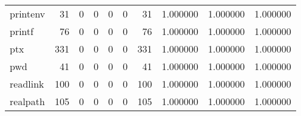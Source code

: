 \begin{tabular}{lrrrrrrrrr}
printenv  &                                        31 &                                                  0 &                                                  0 &                                                  0 &                                                  0 &                                                 31 &                                           1.000000 &                               1.000000 &                             1.000000 \\
printf    &                                        76 &                                                  0 &                                                  0 &                                                  0 &                                                  0 &                                                 76 &                                           1.000000 &                               1.000000 &                             1.000000 \\
ptx       &                                       331 &                                                  0 &                                                  0 &                                                  0 &                                                  0 &                                                331 &                                           1.000000 &                               1.000000 &                             1.000000 \\
pwd       &                                        41 &                                                  0 &                                                  0 &                                                  0 &                                                  0 &                                                 41 &                                           1.000000 &                               1.000000 &                             1.000000 \\
readlink  &                                       100 &                                                  0 &                                                  0 &                                                  0 &                                                  0 &                                                100 &                                           1.000000 &                               1.000000 &                             1.000000 \\
realpath  &                                       105 &                                                  0 &                                                  0 &                                                  0 &                                                  0 &                                                105 &                                           1.000000 &                               1.000000 &                             1.000000 \\

\end{tabular}
